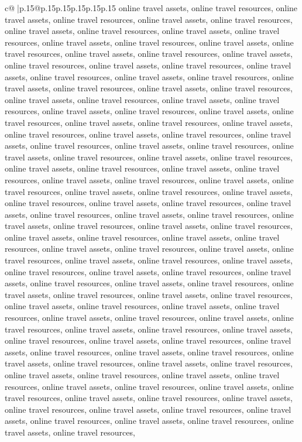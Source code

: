 \documentclass{article}
\begin{document}
{\begin{supertabular}{c@{$\;$}|p{.15\linewidth}@{}p{.15\linewidth}p{.15\linewidth}p{.15\linewidth}p{.15\linewidth}p{.15\linewidth}}
{{{online travel assets, online travel resources, online travel assets, online travel resources, online travel assets, online travel resources, online travel assets, online travel resources, online travel assets, online travel resources, online travel assets, online travel resources, online travel assets, online travel resources, online travel assets, online travel resources, online travel assets, online travel resources, online travel assets, online travel resources, online travel assets, online travel resources, online travel assets, online travel resources, online travel assets, online travel resources, online travel assets, online travel resources, online travel assets, online travel resources, online travel assets, online travel resources, online travel assets, online travel resources, online travel assets, online travel resources, online travel assets, online travel resources, online travel assets, online travel resources, online travel assets, online travel resources, online travel assets, online travel resources, online travel assets, online travel resources, online travel assets, online travel resources, online travel assets, online travel resources, online travel assets, online travel resources, online travel assets, online travel resources, online travel assets, online travel resources, online travel assets, online travel resources, online travel assets, online travel resources, online travel assets, online travel resources, online travel assets, online travel resources, online travel assets, online travel resources, online travel assets, online travel resources, online travel assets, online travel resources, online travel assets, online travel resources, online travel assets, online travel resources, online travel assets, online travel resources, online travel assets, online travel resources, online travel assets, online travel resources, online travel assets, online travel resources, online travel assets, online travel resources, online travel assets, online travel resources, online travel assets, online travel resources, online travel assets, online travel resources, online travel assets, online travel resources, online travel assets, online travel resources, online travel assets, online travel resources, online travel assets, online travel resources, online travel assets, online travel resources, online travel assets, online travel resources, online travel assets, online travel resources, online travel assets, online travel resources, online travel assets, online travel resources, online travel assets, online travel resources, online travel assets, online travel resources, online travel assets, online travel resources, online travel assets, online travel resources, online travel assets, online travel resources, online travel assets, online travel resources, online travel assets, online travel resources, online travel assets, online travel resources, online travel assets, online travel resources, online travel assets, online travel resources, online travel assets, online travel resources, online travel assets, online travel resources, online travel assets, online travel resources, online travel assets, online travel resources, }}}
\end{supertabular}}
\end{document}
